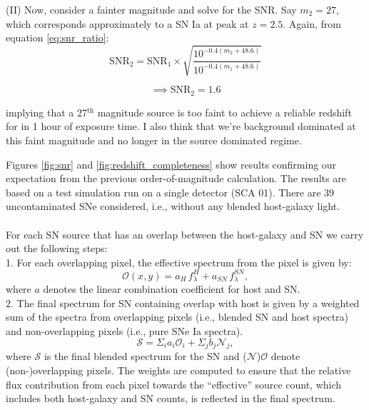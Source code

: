 \documentclass[12pt]{article}
\begin{document}
(II) Now, consider a fainter magnitude and solve for the SNR. Say $m_2 = 27$, which corresponds approximately to a SN Ia at peak at $z=2.5$. Again, from equation \ref{eq:snr_ratio}:
\begin{equation}
\mathrm{ SNR_2 = SNR_1 } \times \sqrt{ \frac{10^{-0.4(m_2 + 48.6)}}{10^{-0.4(m_1 + 48.6)}} }
\end{equation}

\begin{equation}
\boxed{
\implies \mathrm{SNR_2} = 1.6
}
\end{equation}

implying that a 27$^\mathrm{th}$ magnitude source is too faint to achieve a reliable redshift for in 1 hour of exposure time. I also think that we're background dominated at this faint magnitude and no longer in the source dominated regime.\\

\clearpage

Figures \ref{fig:snr} and \ref{fig:redshift_completeness} show results confirming our expectation from the previous order-of-magnitude calculation. The results are based on a test simulation run on a single detector (SCA 01). There are 39 uncontaminated SNe considered, i.e., without any blended host-galaxy light.\\

\\
For each SN source that has an overlap between the host-galaxy and SN we carry out the following steps:\\
1. For each overlapping pixel, the effective spectrum from the pixel is given by:
\begin{equation}
\mathcal{O}(x,y) = a_H\,f^H_\lambda + a_{SN}\,f^{SN}_\lambda,
\end{equation}
where $a$ denotes the linear combination coefficient for host and SN.\\
2. The final spectrum for SN containing overlap with host is given by a weighted sum of the spectra from overlapping pixels (i.e., blended SN and host spectra) and non-overlapping pixels (i.e., pure SNe Ia spectra).
\begin{equation}
\mathcal{S} = \Sigma_i a_i \mathcal{O}_i + \Sigma_j b_j \mathcal{N}_j,
\end{equation}
where $\mathcal{S}$ is the final blended spectrum for the SN and ($\mathcal{N}$)$\mathcal{O}$ denote (non-)overlapping pixels. The weights are computed to ensure that the relative flux contribution from each pixel towards the ``effective'' source count, which includes both host-galaxy and SN counts, is reflected in the final spectrum.\\
\end{document}
